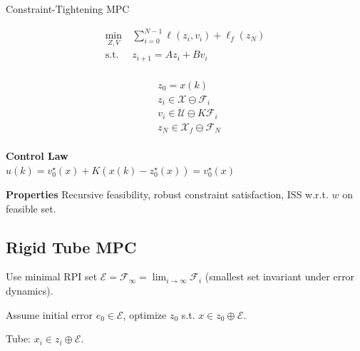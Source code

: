 \begin{sstTitleBox}[RoyalBlue]{Constraint-Tightening MPC}
  \begin{sstOnlyFrame}
    \begin{minipage}[t]{0.57\linewidth}
      \[
        \begin{aligned}
          \min_{Z,V} \         & \sum_{i=0}^{N-1} \ell(z_i, v_i) +
          \ell_f(z_N) \\
          \mathrm{s.t.}\  & z_{i+1} = Az_i + Bv_i                   \\
      \end{aligned}\]
    \end{minipage}
    \begin{minipage}[t]{0.4\linewidth}
      \[
        \begin{aligned}
          & z_0 = x(k)                                       \\
          & z_i \in \mathcal{X} \ominus \mathcal{F}_i        \\
          & v_i \in \mathcal{U} \ominus K\mathcal{F}_i     \\
          & z_N \in \mathcal{X}_f \ominus \mathcal{F}_N \\
      \end{aligned}\]
    \end{minipage}
  \end{sstOnlyFrame}
  \begin{sstOnlyFrame}
    \textbf{Control Law}\\
    $u(k) = v_0^\star(x) + K(x(k) - z_0^\star(x)) = v_0^\star(x)$
  \end{sstOnlyFrame}
  \begin{sstOnlyFrame}
    \textbf{Properties}
    Recursive feasibility, robust constraint satisfaction,
    ISS w.r.t. $w$ on feasible set.
  \end{sstOnlyFrame}
\end{sstTitleBox}

\subsection{Rigid Tube MPC}

Use minimal RPI set $\mathcal{E} = \mathcal{F}_\infty =
\lim_{i\to\infty} \mathcal{F}_i$ (smallest set invariant under error dynamics).

Assume initial error $e_0 \in \mathcal{E}$, optimize $z_0$ s.t. $x
\in z_0 \oplus \mathcal{E}$.

Tube: $x_i \in z_i \oplus \mathcal{E}$.

